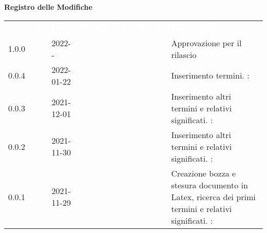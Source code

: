 

{\LARGE{\textbf{Registro delle Modifiche}}} \\

\renewcommand{\arraystretch}{1.5}
\begin{longtable}{ m{}<{\centering}  m{}<{\centering}  m{}<{\centering}  m{}<{\centering}  m{}<{\centering} }
	\rowcolor{darkblue}
	\textcolor{white}{\textbf{Versione}} &\textcolor{white}{\textbf{Data}}& \textcolor{white}{\textbf{Nominativo}} & \textcolor{white}{\textbf{Ruolo}}&\textcolor{white}{\textbf{Descrizione}}\\ 

	1.0.0 & 2022- - &  & \RE & Approvazione per il rilascio \\	
	
	0.0.4 & 2022-01-22 & \GC & \AN & Inserimento termini. \AdR{} \VE: \textit{} \\ 

	0.0.3& 2021-12-01 & \LW &\AN & Inserimento altri termini \AdR{} e relativi significati. \VE{}: \textit{\PV} \\

	0.0.2& 2021-11-30 & \FP & \AN & Inserimento altri termini \AdR{} e relativi significati. \VE{}: \textit{\PV} \\

	0.0.1& 2021-11-29 & \GC & \AN & Creazione bozza e stesura documento in Latex, ricerca dei primi termini e relativi significati. \VE{}: \textit{\PV} \\

\end{longtable}

\pagebreak

\pagebreak